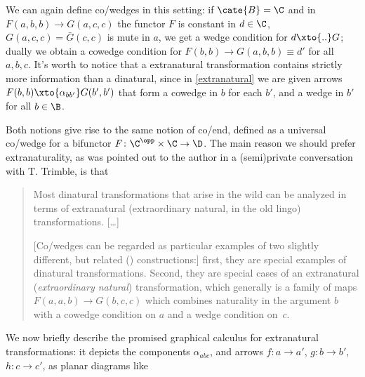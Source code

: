 \begin{remark}
We can again define co/wedges in this setting: if $\cate{B}=\C$ and in $F(a,b,b)\to G(a,c,c)$ the functor $F$ is constant in $d\in\C$, $G(a,c,c)=\bar G(c,c)$ is mute in $a$, we get a wedge condition for $d\xto{..}G$; dually we obtain a cowedge condition for $F(b,b)\to G(a,b,b)\equiv d'$ for all $a,b,c$. It's worth to notice that a extranatural transformation contains strictly more information than a dinatural, since in \adef\ref{extranatural} we are given arrows $F(b,b) \xto{\alpha_{bb'}} G(b',b')$ that form a cowedge in $b$ for each $b'$, and a wedge in $b'$ for all $b\in\B$.
\end{remark}
Both notions give rise to the same notion of co/end, defined as a universal co/wedge for a bifunctor $F\colon \C^\opp\times\C\to \D$. The main reason we should prefer extranaturality, as was pointed out to the author in a (semi)private conversation with T\@. Trimble, is that
\begin{quote}
\small 
Most dinatural transformations that arise in the wild can be analyzed in terms of extranatural (extraordinary natural, in the old lingo) transformations. [\dots]

[Co/wedges can be regarded as particular examples of two slightly different, but related (\aprop {}) constructions:] first, they are special examples of dinatural transformations. Second, they are special cases of an extranatural (\emph{extraordinary natural}) transformation, which generally is a family of maps $F(a, a, b) \to G(b, c, c)$ which combines naturality in the argument $b$ with a cowedge condition on $a$ and a wedge condition on~$c$.
\end{quote}
We now briefly describe the promised graphical calculus for extranatural transformations: it depicts the components $\alpha_{abc}$, and arrows $f\colon a\to a'$, $g\colon b\to b'$, $h\colon c\to c'$, as planar diagrams like
